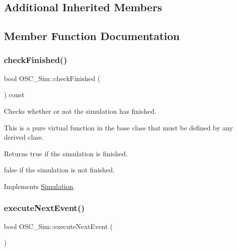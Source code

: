 \subsection*{Additional Inherited Members}


\subsection{Member Function Documentation}
\mbox{\label{class_o_s_c___sim_ab3e4258c850b48ec02e4d3a88b583115}} 
\subsubsection{\texorpdfstring{check\+Finished()}{checkFinished()}}
{\footnotesize\ttfamily bool O\+S\+C\+\_\+\+Sim\+::check\+Finished (\begin{DoxyParamCaption}{ }\end{DoxyParamCaption}) const\hspace{0.3cm}{\ttfamily [virtual]}}



Checks whether or not the simulation has finished. 

This is a pure virtual function in the base class that must be defined by any derived class. \begin{DoxyReturn}{Returns}
true if the simulation is finished. 

false if the simulation is not finished. 
\end{DoxyReturn}


Implements \hyperlink{class_simulation_af69bb46977a3a0084214a194c888e16c}{Simulation}.

\mbox{\label{class_o_s_c___sim_a41bdb6368c71e1a3cb0efdc2a55d7869}} 
\subsubsection{\texorpdfstring{execute\+Next\+Event()}{executeNextEvent()}}
{\footnotesize\ttfamily bool O\+S\+C\+\_\+\+Sim\+::execute\+Next\+Event (\begin{DoxyParamCaption}{ }\end{DoxyParamCaption})\hspace{0.3cm}{\ttfamily [virtual]}}



